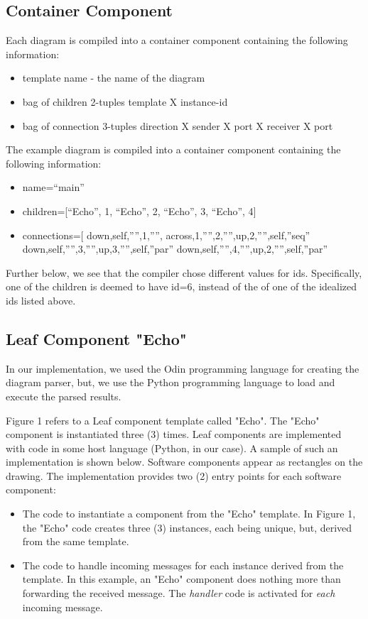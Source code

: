 \documentclass[10pt,anonymous,review]{acmart}
\begin{document}
\subsection{Container Component}
Each diagram is compiled into a container component containing the following information:
\begin{itemize}
\item template name - the name of the diagram
\item bag of children 2-tuples {template X instance-id}
\item bag of connection 3-tuples {direction X {sender X port} X {receiver X port}}
\end{itemize}
The example diagram is compiled into a container component containing the following information:
\begin{itemize}
\item name=“main”
\item children=[{“Echo”, 1}, {“Echo”, 2}, {“Echo”, 3}, {“Echo”, 4}]
\item connections=[
{down,{self,””},{1,””}}, {across,{1,””},{2,””}},{up,{2,””},{self,”seq”}}
{down,{self,””},{3,””}},{up,{3,””},{self,”par”}}
{down,{self,””},{4,””}},{up,{2,””},{self,”par”}}
\end{itemize}
Further below, we see that the compiler chose different values for ids. Specifically, one of the children is deemed to have id=6, instead of the of one of the idealized ids listed above.


\subsection{Leaf Component "Echo"}
In our implementation, we used the Odin programming language for
creating the diagram parser, but, we use the Python programming
language to load and execute the parsed results.

Figure 1 refers to a Leaf component template called "Echo". The "Echo"
component is instantiated three (3) times. Leaf components are
implemented with code in some host language (Python, in our case). A
sample of such an implementation is shown below. Software components
appear as rectangles on the drawing. The implementation provides two (2)
entry points for each software component:
\begin{itemize}
\item The code to instantiate a component from the "Echo" template. In Figure
1, the "Echo" code creates three (3) instances, each being unique, but,
derived from the same template.

\item The code to handle incoming messages for each instance derived from the
template. In this example, an "Echo" component does nothing more than
forwarding the received message. The \emph{handler} code is activated for
\emph{each} incoming message.
\end{itemize}
\end{document}
